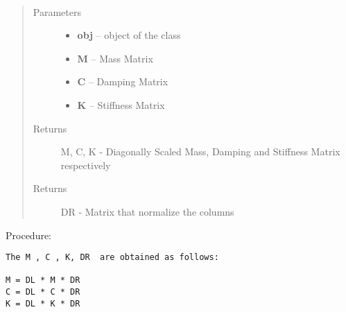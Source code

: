 \documentclass[letterpaper,10pt,english]{sphinxmanual}
\begin{document}
\begin{fulllineitems}
\label{index:brake.initialize.diagscale.diag_scale_matrices}~\begin{quote}\begin{description}
\item[{Parameters}] \leavevmode\begin{itemize}
\item {} 
\textbf{obj} -- object of the class 

\item {} 
\textbf{M} -- Mass Matrix

\item {} 
\textbf{C} -- Damping Matrix

\item {} 
\textbf{K} -- Stiffness Matrix

\end{itemize}

\item[{Returns}] \leavevmode
M, C, K - Diagonally Scaled  Mass, Damping and Stiffness Matrix respectively

\item[{Returns}] \leavevmode
DR - Matrix that normalize the columns

\end{description}\end{quote}

Procedure:

\begin{Verbatim}[commandchars=\\\{\}]
The M , C , K, DR  are obtained as follows:

M = DL * M * DR
C = DL * C * DR
K = DL * K * DR
\end{Verbatim}

\end{fulllineitems}

\end{document}
